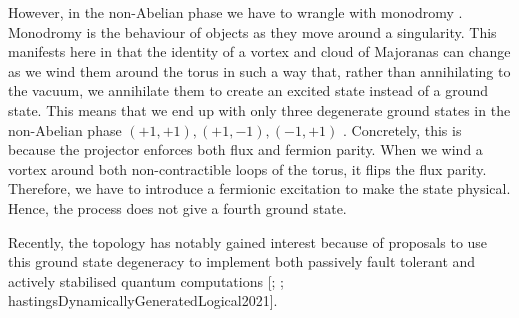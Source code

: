 However, in the non-Abelian phase we have to wrangle with monodromy \autocite{chungExplicitMonodromyMoore2007,oshikawaTopologicalDegeneracyNonAbelian2007}. Monodromy is the behaviour of objects as they move around a singularity. This manifests here in that the identity of a vortex and cloud of Majoranas can change as we wind them around the torus in such a way that, rather than annihilating to the vacuum, we annihilate them to create an excited state instead of a ground state. This means that we end up with only three degenerate ground states in the non-Abelian phase \((+1, +1), (+1, -1), (-1, +1)\) \autocite[yaoAlgebraicSpinLiquid2009a]{chungTopologicalQuantumPhase2010}. Concretely, this is because the projector enforces both flux and fermion parity. When we wind a vortex around both non-contractible loops of the torus, it flips the flux parity. Therefore, we have to introduce a fermionic excitation to make the state physical. Hence, the process does not give a fourth ground state.

Recently, the topology has notably gained interest because of proposals to use this ground state degeneracy to implement both passively fault tolerant and actively stabilised quantum computations {[}\textcite{kitaevFaulttolerantQuantumComputation2003}; \textcite{poulinStabilizerFormalismOperator2005}; hastingsDynamicallyGeneratedLogical2021{]}.
